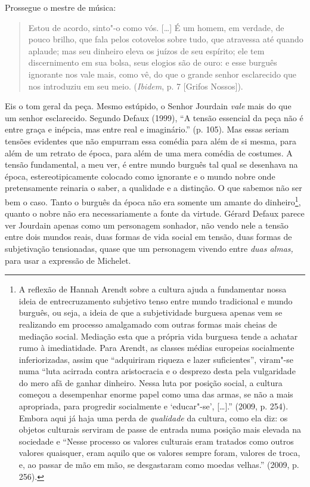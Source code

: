 Prossegue o mestre de música:

\begin{quote}
Estou de acordo, sinto"-o como vós. [\ldots{}] É um homem, em
verdade, de pouco brilho, que fala pelos cotovelos sobre tudo, que
atravessa até quando aplaude; mas seu dinheiro eleva os juízos de seu
espírito; ele tem discernimento em sua bolsa, seus elogios são de ouro:
e esse burguês ignorante nos vale mais, como vê, do que o grande senhor
esclarecido que nos introduziu em seu meio. (\emph{Ibidem}, p. 7
[Grifos Nossos]).
\end{quote}

Eis o tom geral da peça. Mesmo estúpido, o Senhor Jourdain \emph{vale}
mais do que um senhor esclarecido. Segundo Defaux (1999), ``A tensão
essencial da peça não é entre graça e inépcia, mas entre real e
imaginário.'' (p. 105). Mas essas seriam tensões evidentes que não
empurram essa comédia para além de si mesma, para além de um retrato de
época, para além de uma mera comédia de costumes. A tensão fundamental,
a meu ver, é entre mundo burguês tal qual se desenhava na época,
estereotipicamente colocado como ignorante e o mundo nobre onde
pretensamente reinaria o saber, a qualidade e a distinção. O que sabemos
não ser bem o caso. Tanto o burguês da época não era somente um amante
do dinheiro\footnote{A reflexão de Hannah Arendt sobre a cultura ajuda a
  fundamentar nossa ideia de entrecruzamento subjetivo tenso entre mundo
  tradicional e mundo burguês, ou seja, a ideia de que a subjetividade
  burguesa apenas vem se realizando em processo amalgamado com outras
  formas mais cheias de mediação social. Mediação esta que a própria
  vida burguesa tende a achatar rumo à imediatidade. Para Arendt, as
  classes médias europeias socialmente inferiorizadas, assim que
  ``adquiriram riqueza e lazer suficientes'', viram"-se numa ``luta
  acirrada contra aristocracia e o desprezo desta pela vulgaridade do
  mero afã de ganhar dinheiro. Nessa luta por posição social, a cultura
  começou a desempenhar enorme papel como uma das armas, se não a mais
  apropriada, para progredir socialmente e `educar"-se',
  [\ldots{}].'' (2009, p. 254). Embora aqui já haja uma perda de
  \emph{qualidade} da cultura, como ela diz: os objetos culturais
  serviram de passe de entrada numa posição mais elevada na sociedade e
  ``Nesse processo os valores culturais eram tratados como outros
  valores quaisquer, eram aquilo que os valores sempre foram, valores de
  troca, e, ao passar de mão em mão, se desgastaram como moedas
  velhas.'' (2009, p. 256).}, quanto o nobre não era necessariamente a
fonte da virtude. Gérard Defaux parece ver Jourdain apenas como um
personagem sonhador, não vendo nele a tensão entre dois mundos reais,
duas formas de vida social em tensão, duas formas de subjetivação
tensionadas, quase que um personagem vivendo entre \emph{duas almas,}
para usar a expressão de Michelet.

